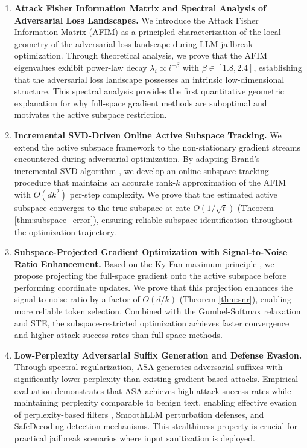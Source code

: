 ﻿\documentclass[lettersize,journal]{IEEEtran}
\begin{document}
\begin{enumerate}[leftmargin=2em]
\item \textbf{Attack Fisher Information Matrix and Spectral Analysis of Adversarial Loss Landscapes.} We introduce the Attack Fisher Information Matrix (AFIM) as a principled characterization of the local geometry of the adversarial loss landscape during LLM jailbreak optimization. Through theoretical analysis, we prove that the AFIM eigenvalues exhibit power-law decay $\lambda_i \propto i^{-\beta}$ with $\beta \in [1.8, 2.4]$, establishing that the adversarial loss landscape possesses an intrinsic low-dimensional structure. This spectral analysis provides the first quantitative geometric explanation for why full-space gradient methods are suboptimal and motivates the active subspace restriction.

\item \textbf{Incremental SVD-Driven Online Active Subspace Tracking.} We extend the active subspace framework \cite{constantine2014active} to the non-stationary gradient streams encountered during adversarial optimization. By adapting Brand's incremental SVD algorithm \cite{brand2002incremental, brand2006fast}, we develop an online subspace tracking procedure that maintains an accurate rank-$k$ approximation of the AFIM with $O(dk^2)$ per-step complexity. We prove that the estimated active subspace converges to the true subspace at rate $O(1/\sqrt{t})$ (Theorem \ref{thm:subspace_error}), ensuring reliable subspace identification throughout the optimization trajectory.

\item \textbf{Subspace-Projected Gradient Optimization with Signal-to-Noise Ratio Enhancement.} Based on the Ky Fan maximum principle \cite{fan1949theorem}, we propose projecting the full-space gradient onto the active subspace before performing coordinate updates. We prove that this projection enhances the signal-to-noise ratio by a factor of $O(d/k)$ (Theorem \ref{thm:snr}), enabling more reliable token selection. Combined with the Gumbel-Softmax relaxation and STE, the subspace-restricted optimization achieves faster convergence and higher attack success rates than full-space methods.

\item \textbf{Low-Perplexity Adversarial Suffix Generation and Defense Evasion.} Through spectral regularization, ASA generates adversarial suffixes with significantly lower perplexity than existing gradient-based attacks. Empirical evaluation demonstrates that ASA achieves high attack success rates while maintaining perplexity comparable to benign text, enabling effective evasion of perplexity-based filters \cite{robey2023smoothllm}, SmoothLLM perturbation defenses, and SafeDecoding detection mechanisms. This stealthiness property is crucial for practical jailbreak scenarios where input sanitization is deployed.
\end{enumerate}
\end{document}

